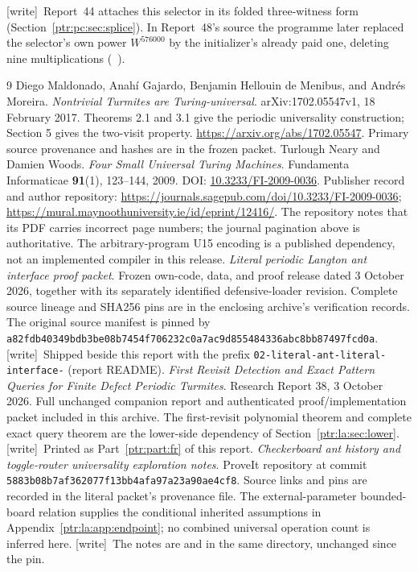 \documentclass[11pt,letterpaper]{article}
\theoremstyle{definition}\newtheorem{definition}[theorem]{Definition}
\theoremstyle{remark}\newtheorem{remark}[theorem]{Remark}
\newcommand{\codeu}[1]{\nolinkurl{#1}}
\newcommand{\wtag}{\textup{[write]}}
\begin{document}
{\small\wtag\ Report~44 attaches this selector in its folded three-witness
form (Section~\ref{ptr:pc:sec:splice}). In Report~48's source the programme
later replaced the selector's own power $W^{576000}$ by the initializer's
already paid one, deleting nine multiplications
(~\cite{ptr:w:share48}).\par}

\begin{thebibliography}{9}
 Diego Maldonado, Anah\'{i} Gajardo, Benjamin Hellouin de Menibus, and Andr\'{e}s Moreira. \emph{Nontrivial Turmites are Turing-universal}. arXiv:1702.05547v1, 18 February 2017. Theorems 2.1 and 3.1 give the periodic universality construction; Section 5 gives the two-visit property. \url{https://arxiv.org/abs/1702.05547}. Primary source provenance and hashes are in the frozen packet.
 Turlough Neary and Damien Woods. \emph{Four Small Universal Turing Machines}. Fundamenta Informaticae \textbf{91}(1), 123--144, 2009. DOI: \href{https://doi.org/10.3233/FI-2009-0036}{10.3233/FI-2009-0036}. Publisher record and author repository: \url{https://journals.sagepub.com/doi/10.3233/FI-2009-0036}; \url{https://mural.maynoothuniversity.ie/id/eprint/12416/}. The repository notes that its PDF carries incorrect page numbers; the journal pagination above is authoritative. The arbitrary-program U15 encoding is a published dependency, not an implemented compiler in this release.
 \emph{Literal periodic Langton ant interface proof packet}. Frozen own-code, data, and proof release dated 3 October 2026, together with its separately identified defensive-loader revision. Complete source lineage and SHA256 pins are in the enclosing archive's verification records. The original source manifest is pinned by \codeu{a82fdb40349bdb3be08b7454f706232c0a7ac9d855484336abc8bb87497fcd0a}. \wtag\ Shipped beside this report with the prefix \texttt{02-literal-ant-literal-interface-} (report README).
 \emph{First Revisit Detection and Exact Pattern Queries for Finite Defect Periodic Turmites}. Research Report 38, 3 October 2026. Full unchanged companion report and authenticated proof/implementation packet included in this archive. The first-revisit polynomial theorem and complete exact query theorem are the lower-side dependency of Section~\ref{ptr:la:sec:lower}. \wtag\ Printed as Part~\ref{ptr:part:fr} of this report.
 \emph{Checkerboard ant history and toggle-router universality exploration notes}. ProveIt repository at commit \codeu{5883b08b7af362077f13bb4afa97a23a90ae4cf8}. Source links and pins are recorded in the literal packet's provenance file. The external-parameter bounded-board relation supplies the conditional inherited assumptions in Appendix~\ref{ptr:la:app:endpoint}; no combined universal operation count is inferred here. \wtag\ The notes are  and  in the same directory, unchanged since the pin.
\end{thebibliography}
\clearpage
\end{document}

